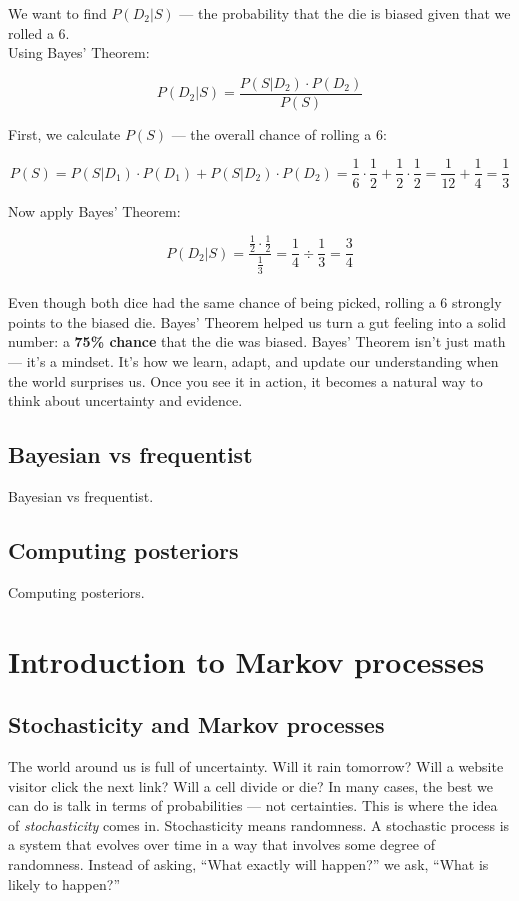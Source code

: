 \documentclass{book}
\begin{document}
We want to find $P(D_2 | S)$ — the probability that the die is biased given that we rolled a 6.\\

Using Bayes’ Theorem:

\[
P(D_2 | S) = \frac{P(S | D_2) \cdot P(D_2)}{P(S)}
\]

First, we calculate $P(S)$ — the overall chance of rolling a 6:

\[
P(S) = P(S|D_1) \cdot P(D_1) + P(S|D_2) \cdot P(D_2) = \frac{1}{6} \cdot \frac{1}{2} + \frac{1}{2} \cdot \frac{1}{2}
= \frac{1}{12} + \frac{1}{4} = \frac{1}{3}
\]

Now apply Bayes' Theorem:

\[
P(D_2 | S) = \frac{\frac{1}{2} \cdot \frac{1}{2}}{\frac{1}{3}} = \frac{1}{4} \div \frac{1}{3} = \frac{3}{4}
\]\\

Even though both dice had the same chance of being picked, rolling a 6 strongly points to the biased die. Bayes’ Theorem helped us turn a gut feeling into a solid number: a \textbf{75\% chance} that the die was biased. Bayes’ Theorem isn’t just math — it’s a mindset. It’s how we learn, adapt, and update our understanding when the world surprises us. Once you see it in action, it becomes a natural way to think about uncertainty and evidence.

\newpage

\section{Bayesian vs frequentist}
Bayesian vs frequentist.

\newpage

\section{Computing posteriors}
Computing posteriors.



\chapter{Introduction to Markov processes}

\section{Stochasticity and Markov processes}

The world around us is full of uncertainty. Will it rain tomorrow? Will a website visitor click the next link? Will a cell divide or die? In many cases, the best we can do is talk in terms of probabilities — not certainties. This is where the idea of \textit{stochasticity} comes in. Stochasticity means randomness. A stochastic process is a system that evolves over time in a way that involves some degree of randomness. Instead of asking, “What exactly will happen?” we ask, “What is likely to happen?”\\
\end{document}
